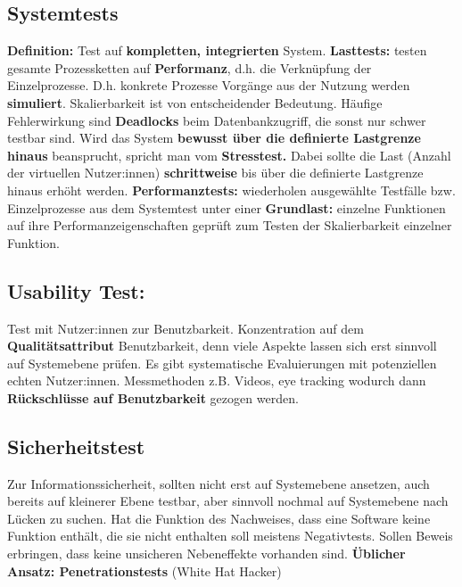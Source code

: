 \documentclass{book}
\begin{document}
    \subsection{Systemtests}
    \textbf{Definition:} Test auf \textbf{kompletten, integrierten} System.
    \newline
    \newline
    \textbf{Lasttests:} testen gesamte Prozessketten auf \textbf{Performanz}, d.h. die Verknüpfung der Einzelprozesse. D.h. konkrete Prozesse Vorgänge aus der Nutzung werden \textbf{simuliert}. \newline
    \newline Skalierbarkeit ist von entscheidender Bedeutung. Häufige Fehlerwirkung sind
    \textbf{Deadlocks} beim Datenbankzugriff, die sonst nur schwer testbar sind.
    \newline Wird das System \textbf{bewusst über die definierte Lastgrenze hinaus} beansprucht, spricht man vom \textbf{Stresstest.}
    \newline
    \newline
    Dabei sollte die Last (Anzahl der virtuellen Nutzer:innen) \textbf{schrittweise} bis über die definierte Lastgrenze hinaus erhöht werden. \newline
    \newline
    \textbf{Performanztests:} wiederholen ausgewählte Testfälle bzw. Einzelprozesse aus dem Systemtest unter einer \textbf{Grundlast:} einzelne Funktionen auf ihre Performanzeigenschaften geprüft zum Testen der Skalierbarkeit einzelner Funktion.
    \subsection{{Usability Test:}}
    Test mit Nutzer:innen zur Benutzbarkeit. Konzentration auf dem \textbf{Qualitätsattribut} Benutzbarkeit, denn viele Aspekte lassen sich erst sinnvoll auf Systemebene prüfen.
    \newline Es gibt systematische Evaluierungen mit potenziellen echten Nutzer:innen. Messmethoden z.B. Videos, eye tracking wodurch dann \textbf{Rückschlüsse auf Benutzbarkeit} gezogen werden.
    \subsection{{Sicherheitstest}}
    Zur Informationssicherheit, sollten nicht erst auf Systemebene ansetzen, auch bereits auf kleinerer Ebene testbar, aber sinnvoll nochmal auf Systemebene nach Lücken zu suchen.
    Hat die Funktion des Nachweises, dass eine Software keine Funktion enthält, die sie nicht enthalten soll meistens Negativtests. Sollen Beweis erbringen, dass keine unsicheren Nebeneffekte vorhanden sind. \newline
    \textbf{Üblicher Ansatz: Penetrationstests} (White Hat Hacker)
\end{document}
